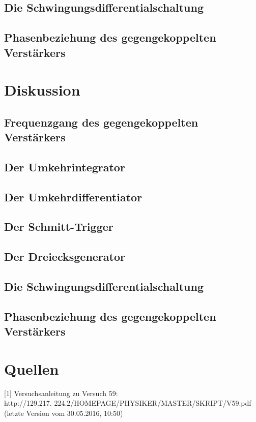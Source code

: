 \documentclass[]{scrartcl}
\begin{document}
\subsection{Die Schwingungsdifferentialschaltung}

\subsection{Phasenbeziehung des gegengekoppelten Verstärkers}

\section{Diskussion}

\subsection{Frequenzgang des gegengekoppelten Verstärkers}

\subsection{Der Umkehrintegrator}

\subsection{Der Umkehrdifferentiator}

\subsection{Der Schmitt-Trigger}

\subsection{Der Dreiecksgenerator}

\subsection{Die Schwingungsdifferentialschaltung}

\subsection{Phasenbeziehung des gegengekoppelten Verstärkers}

\section{Quellen}
{[1]} Versuchsanleitung zu Versuch 59: \\
http://129.217.
224.2/HOMEPAGE/PHYSIKER/MASTER/SKRIPT/V59.pdf (letzte Version vom 30.05.2016, 10:50)\\
\end{document}
